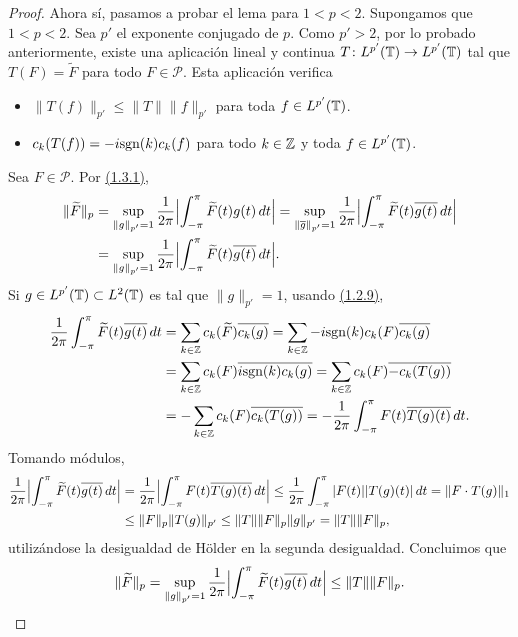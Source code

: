 \documentclass[a4paper, 12pt, oneside]{book}
\begin{document}
\begin{proof}
    Ahora sí, pasamos a probar el lema para $1 < p < 2$. Supongamos que $1<p<2$. Sea $p'$ el exponente conjugado de $p$. Como $p' > 2$, por lo probado anteriormente, existe una aplicación lineal y continua $T \colon L^{p'}(\mathbb T)\to L^{p'}(\mathbb T)$ tal que $T(F) = \widetilde{F}$ para todo $F \in \mathcal{P}$. Esta aplicación verifica
    \begin{itemize}
        \item $\|T(f)\|_{p'}\leq \|T\|\|f\|_{p'}$ para toda $f \in L^{p'}(\mathbb T)$.
        \item $c_k(T(f)) = -i\textup{sgn}(k)c_k(f)$ para todo $k\in\mathbb Z$ y toda $f \in L^{p'}(\mathbb T)$.
    \end{itemize}
    Sea $F \in \mathcal{P}$. Por \hyperref[1.3.1]{\color{blue}(1.3.1)},
    \[\begin{aligned}[t]
        \|\widetilde{F}\|_p &=  \sup_{\|g\|_{p'} = 1} \frac{1}{2\pi}\Bigl|\int_{-\pi}^{\pi} \widetilde{F}(t)g(t) \, dt\Bigr| = \sup_{\|\overline{g}\|_{p'} = 1} \frac{1}{2\pi}\Bigl|\int_{-\pi}^{\pi} \widetilde{F}(t)\overline{g(t)} \, dt\Bigr| \\
        &= \sup_{\|g\|_{p'} = 1} \frac{1}{2\pi}\Bigl|\int_{-\pi}^{\pi} \widetilde{F}(t)\overline{g(t)} \, dt\Bigr|.
    \end{aligned}\]
    Si $g \in L^{p'}(\mathbb T) \subset L^2(\mathbb T)$ es tal que $\|g\|_{p'} = 1$, usando \hyperref[1.2.9]{\color{blue}(1.2.9)},
    \begin{align*}
        \frac{1}{2\pi}\int_{-\pi}^{\pi} \widetilde{F}(t)\overline{g(t)} \, dt &= \sum_{k\in\mathbb Z} c_k(\widetilde{F})\overline{c_k(g)} = \sum_{k\in\mathbb Z} -i\textup{sgn}(k)c_k(F)\overline{c_k(g)} \\
        &= \sum_{k\in\mathbb Z}c_k(F)\overline{i\textup{sgn}(k)c_k(g)} = \sum_{k\in\mathbb Z}c_k(F)\overline{-c_k(T(g))} \\
        &= -\sum_{k\in\mathbb Z}c_k(F)\overline{c_k(T(g))} =-\frac{1}{2\pi}\int_{-\pi}^{\pi} F(t)\overline{T(g)(t)} \, dt.
    \end{align*}
    Tomando módulos,
    \begin{align*}
        \frac{1}{2\pi}\Bigl|\int_{-\pi}^{\pi} \widetilde{F}(t)\overline{g(t)} \, dt\Bigr| &= \frac{1}{2\pi}\Bigl|\int_{-\pi}^{\pi} F(t)\overline{T(g)(t)} \, dt\Bigr| \leq \frac{1}{2\pi}\int_{-\pi}^{\pi} |F(t)||T(g)(t)| \, dt = \|F \cdot T(g)\|_1 \\ 
        &\leq \|F\|_p\|T(g)\|_{p'} \leq \|T\|\|F\|_p\|g\|_{p'} = \|T\|\|F\|_p,
    \end{align*} 
    utilizándose la desigualdad de Hölder en la segunda desigualdad. Concluimos que
    \[\|\widetilde{F}\|_p = \sup_{\|g\|_{p'}=1}\frac{1}{2\pi}\Bigl|\int_{-\pi}^{\pi} \widetilde{F}(t)\overline{g(t)} \, dt\Bigr| \leq \|T\|\|F\|_p. \qedhere\]
\end{proof}
\end{document}
